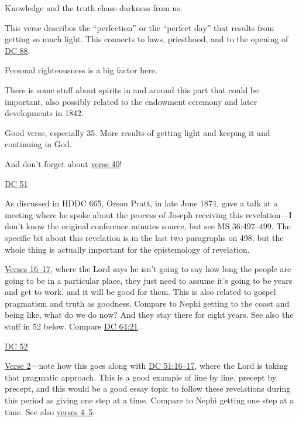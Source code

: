 \begin{compactdesc}
\begin{compactitem}
\begin{compactitem}
							\item[25] Knowledge and the truth chase darkness from us.
							\item[27] This verse describes the ``perfection'' or the ``perfect day'' that results from getting so much light. This connects to laws, priesthood, and to the opening of \hyperref[DC88]{DC 88}.
							\item[28--29] Personal righteousness is a big factor here.
							\item[31] There is some stuff about spirits in and around this part that could be important, also possibly related to the endowment ceremony and later developments in 1842.
							\item[34--35] Good verse, especially 35. More results of getting light and keeping it and continuing in God.
						\end{compactitem}
					\item And don't forget about \hyperref[DC50-40]{verse 40}!
				\end{compactitem} 
			\item \hyperref[DC51]{DC 51}
				\begin{compactitem}
					\item As discussed in HDDC 665, Orson Pratt, in late June 1874, gave a talk at a meeting where he spoke about the process of Joseph receiving this revelation---I don't know the original conference minutes source, but see MS 36:497--499. The specific bit about this revelation is in the last two paragraphs on 498, but the whole thing is actually important for the epistemology of revelation.
					\item \hyperref[DC51-16]{Verses 16--17}, where the Lord says he isn't going to say how long the people are going to be in a particular place, they just need to assume it's going to be years and get to work, and it will be good for them. This is also related to gospel pragmatism and truth as goodness. Compare to Nephi getting to the coast and being like, what do we do now? And they stay there for eight years. See also the stuff in 52 below. Compare \hyperref[DC64-21]{DC 64:21}.
				\end{compactitem}
			\item \hyperref[DC52]{DC 52}
				\begin{compactitem}
					\item \hyperref[DC52-2]{Verse 2}---note how this goes along with \hyperref[DC51-16]{DC 51:16--17}, where the Lord is taking that pragmatic approach. This is a good example of line by line, precept by precept, and this would be a good essay topic to follow these revelations during this period as giving one step at a time. Compare to Nephi getting one step at a time. See also \hyperref[DC52-4]{verses 4--5}.

\end{compactitem}
\end{compactdesc}
